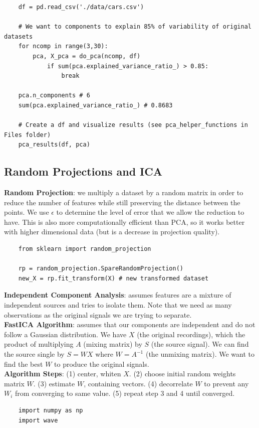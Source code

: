 \documentclass[11pt, a4paper]{article}
\begin{document}
\begin{spacing}{1.1}
	\begin{lstlisting}
	df = pd.read_csv('./data/cars.csv')
	
	# We want to components to explain 85% of variability of original datasets
	for ncomp in range(3,30):
		pca, X_pca = do_pca(ncomp, df)
			if sum(pca.explained_variance_ratio_) > 0.85:
				break
	
	pca.n_components # 6
	sum(pca.explained_variance_ratio_) # 0.8683
	
	# Create a df and visualize results (see pca_helper_functions in Files folder)
	pca_results(df, pca)
	\end{lstlisting} \vspace*{2mm}
	
	\subsection{Random Projections and ICA}
	\textbf{Random Projection}: we multiply a dataset by a random matrix in order to reduce the number of features while still preserving the distance between the points. We use $\epsilon$ to determine the level of error that we allow the reduction to have. This is also more computationally efficient than PCA, so it works better with higher dimensional data (but is a decrease in projection quality).
	\begin{lstlisting}
	from sklearn import random_projection
	
	rp = random_projection.SpareRandomProjection()
	new_X = rp.fit_transform(X) # new transformed dataset
	\end{lstlisting} \vspace*{2mm}
	\textbf{Independent Component Analysis}: assumes features are a mixture of independent sources and tries to isolate them. Note that we need as many observations as the original signals we are trying to separate.\vspace*{2mm}\\
	\textbf{FastICA Algorithm}: assumes that our components are independent and do not follow a Gaussian distribution. We have $X$ (the original recordings), which the product of multiplying $A$ (mixing matrix) by $S$ (the source signal). We can find the source single by $S=WX$ where $W = A^{-1}$ (the unmixing matrix). We want to find the best $W$ to produce the original signals. \vspace*{2mm}\\
	\textbf{Algorithm Steps}: (1) center, whiten $X$. (2) choose initial random weights matrix $W$. (3) estimate $W$, containing vectors. (4) decorrelate $W$ to prevent any $W_i$ from converging to same value. (5) repeat step 3 and 4 until converged.
	\begin{lstlisting}
	import numpy as np
	import wave
	

\end{lstlisting}
\end{spacing}
\end{document}
